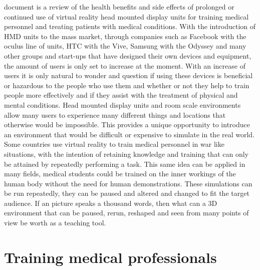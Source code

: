 \documentclass[10pt,journal,compsoc]{IEEEtran}
\begin{document}
	 document is a review of the health benefits and side effects of prolonged or continued use of virtual reality head mounted display units for training medical personnel and treating patients with medical conditions. With the introduction of HMD units to the mass market, through companies such as Facebook with the oculus line of units, HTC with the Vive, Samsung with the Odyssey and many other groups and start-ups that have designed their own devices and equipment, the amount of users is only set to increase at the moment. With an increase of users it is only natural to wonder and question if using these devices is beneficial or hazardous to the people who use them and whether or not they help to train people more effectively and if they assist with the treatment of physical and mental conditions. \newline \newline
	Head mounted display units and room scale environments allow many users to experience many different things and locations that otherwise would be impossible. This provides a unique opportunity to introduce an environment that would be difficult or expensive to simulate in the real world. Some countries use virtual reality to train medical personnel in war like situations, with the intention of retaining knowledge and training that can only be attained by repeatedly performing a task. This same idea can be applied in many fields,  medical students could be trained on the inner workings of the human body without the need for human demonstrations. These simulations can be run repeatedly, they can be paused and altered and changed to fit the target audience. If an picture speaks a thousand words, then what can a 3D environment that can be paused, rerun, reshaped and seen from many points of view be worth as a teaching tool.
	\newline
	
	
	
	\section{Training medical professionals} \newline
	
\end{document}
